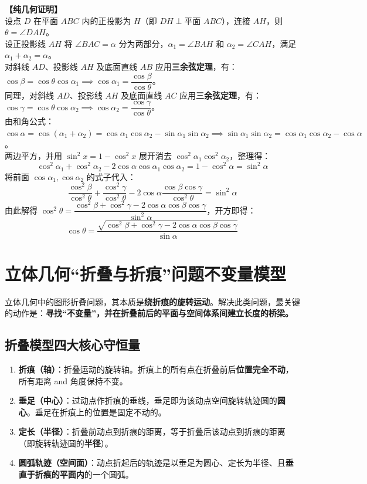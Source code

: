 \documentclass[11pt,a4paper]{ctexart}
\begin{document}
\noindent\textbf{【纯几何证明】}\\
设点 $D$ 在平面 $ABC$ 内的正投影为 $H$（即 $DH \perp \text{平面 } ABC$），连接 $AH$，则 $\theta = \angle DAH$。\\
设正投影线 $AH$ 将 $\angle BAC = \alpha$ 分为两部分，$\alpha_1 = \angle BAH$ 和 $\alpha_2 = \angle CAH$，满足 $\alpha_1 + \alpha_2 = \alpha$。\\
对斜线 $AD$、投影线 $AH$ 及底面直线 $AB$ 应用\textbf{三余弦定理}，有：$\cos\beta = \cos\theta \cos\alpha_1 \implies \cos\alpha_1 = \dfrac{\cos\beta}{\cos\theta}$。\\
同理，对斜线 $AD$、投影线 $AH$ 及底面直线 $AC$ 应用\textbf{三余弦定理}，有：$\cos\gamma = \cos\theta \cos\alpha_2 \implies \cos\alpha_2 = \dfrac{\cos\gamma}{\cos\theta}$。\\
由和角公式：$\cos\alpha = \cos(\alpha_1 + \alpha_2) = \cos\alpha_1 \cos\alpha_2 - \sin\alpha_1 \sin\alpha_2 \implies \sin\alpha_1 \sin\alpha_2 = \cos\alpha_1 \cos\alpha_2 - \cos\alpha$。\\
两边平方，并用 $\sin^2 x = 1 - \cos^2 x$ 展开消去 $\cos^2\alpha_1 \cos^2\alpha_2$，整理得：
\[ \cos^2\alpha_1 + \cos^2\alpha_2 - 2\cos\alpha \cos\alpha_1 \cos\alpha_2 = 1 - \cos^2\alpha = \sin^2\alpha \]
将前面 $\cos\alpha_1, \cos\alpha_2$ 的式子代入：
\[ \frac{\cos^2\beta}{\cos^2\theta} + \frac{\cos^2\gamma}{\cos^2\theta} - 2\cos\alpha \frac{\cos\beta \cos\gamma}{\cos^2\theta} = \sin^2\alpha \]
由此解得 $\cos^2\theta = \dfrac{\cos^2\beta + \cos^2\gamma - 2\cos\alpha \cos\beta \cos\gamma}{\sin^2\alpha}$，开方即得：
\[ \boxed{\cos\theta = \frac{\sqrt{\cos^2\beta + \cos^2\gamma - 2\cos\alpha \cos\beta \cos\gamma}}{\sin\alpha}} \]

\newpage

\section{立体几何“折叠与折痕”问题不变量模型}

立体几何中的图形折叠问题，其本质是\textbf{绕折痕的旋转运动}。解决此类问题，最关键的动作是：\textbf{寻找“不变量”，并在折叠前后的平面与空间体系间建立长度的桥梁。}

\subsection{折叠模型四大核心守恒量}
\begin{enumerate}
  \item \textbf{折痕（轴）}：折叠运动的旋转轴。折痕上的所有点在折叠前后\textbf{位置完全不动}，所有距离 and 角度保持不变。
  \item \textbf{垂足（中心）}：过动点作折痕的垂线，垂足即为该动点空间旋转轨迹圆的\textbf{圆心}。垂足在折痕上的位置是固定不动的。
  \item \textbf{定长（半径）}：折叠前动点到折痕的距离，等于折叠后该动点到折痕的距离（即旋转轨迹圆的\textbf{半径}）。
  \item \textbf{圆弧轨迹（空间面）}：动点折起后的轨迹是以垂足为圆心、定长为半径、且\textbf{垂直于折痕的平面内}的一个圆弧。
\end{enumerate}
\end{document}
